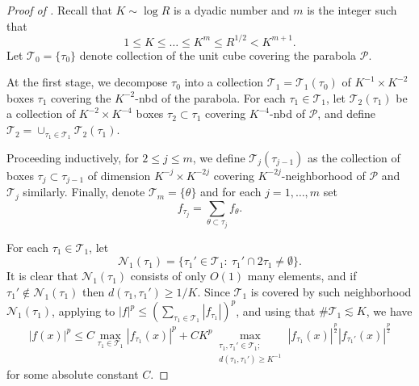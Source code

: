 \documentclass[11pt]{amsart}
\theoremstyle{definition}
\theoremstyle{remark}
\newcommand{\les}{\lesssim}
\begin{document}
\begin{proof}[Proof of ]
Recall that $K\sim \log R$ is a dyadic number and $m$ is the integer such that 
\[1\le K\le \dots \le K^m \leq R^{1/2} < K^{m+1}.\]
Let $\mathcal T_0 =\{ \tau_0\}$ denote collection of the unit cube covering the parabola $\mathcal P$.

At the first stage, we decompose $\tau_0$ into a collection $\mathcal T_1=\mathcal T_1(\tau_0)$ of $K^{-1}\times K^{-2}$ boxes $\tau_1$ covering the $K^{-2}$-nbd of the parabola.
For each $\tau_1\in \mathcal T_1$,  let $\mathcal T_2(\tau_1)$ be a  collection of $K^{-2}\times K^{-4}$ boxes $\tau_2 \subset \tau_1$ covering $K^{-4}$-nbd of $\mathcal P$, and define $\mathcal T_2 = \cup_{\tau_1\in \mathcal T_1} \mathcal T_2(\tau_1)$.

Proceeding inductively, for $2\le j \le m$, we define $\mathcal T_j(\tau_{j-1})$ as the collection of boxes $\tau_j \subset \tau_{j-1}$ of dimension $K^{-j}\times K^{-2j}$ covering $K^{-2j}$-neighborhood of $\mathcal P$ and $\mathcal T_j$ similarly.
Finally, denote $\mathcal T_m=\{\theta\}$ and for each $j=1,\dots,m$ set
\[f_{\tau_j} = \sum_{\theta \subset \tau_j} f_\theta.\]


For each $\tau_1\in \mathcal T_1$, let 
\[
\mathcal N_1(\tau_1)=\{\tau_1'\in \mathcal T_1:~ \tau_1' \cap 2\tau_1 \neq \emptyset\}.
\]
It is clear that $\mathcal N_1(\tau_1)$ consists of only $O(1)$ many elements, and if $\tau_1' \notin \mathcal N_1(\tau_1)$ then $d(\tau_1,\tau_1')\ge 1/K$.
Since $\mathcal T_1$ is covered by such neighborhood $\mathcal N_1(\tau_1)$,
applying  to $|f|^p\leq (\sum_{\tau_1\in \mathcal T_1} |f_{\tau_1}|)^p$, and using that $\# \mathcal T_1 \les K$, we have
 \[ |f(x)|^p 
 \leq C\max_{\tau_1 \in \mathcal T_1} |f_{\tau_1}(x)|^p + CK^p \max_{\substack{\tau_1,\tau_1' \in \mathcal T_1; \\ d(\tau_1,\tau_1')\ge K^{-1} }} |f_{\tau_1}(x)|^{\frac p2} |f_{\tau_1'}(x)|^{\frac p2}   \]
for some absolute constant $C$.


\end{proof}
\end{document}
